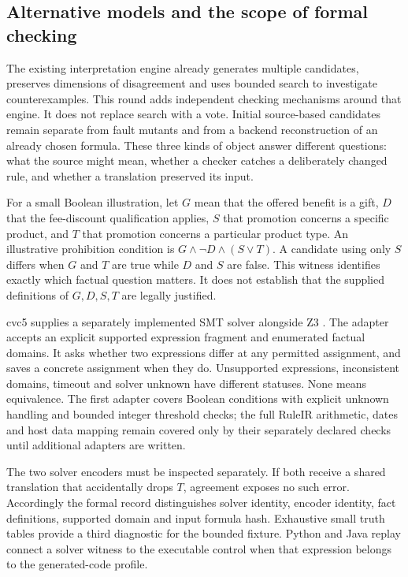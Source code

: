 \documentclass[12pt,a4paper,oneside,openany]{book}
\begin{document}
\subsection{Alternative models and the scope of formal checking}

The existing interpretation engine already generates multiple candidates,
preserves dimensions of disagreement and uses bounded search to investigate
counterexamples. This round adds independent checking mechanisms around that
engine. It does not replace search with a vote. Initial source-based candidates
remain separate from fault mutants and from a backend reconstruction of an
already chosen formula. These three kinds of object answer different questions:
what the source might mean, whether a checker catches a deliberately changed
rule, and whether a translation preserved its input.

For a small Boolean illustration, let $G$ mean that the offered benefit is a
gift, $D$ that the fee-discount qualification applies, $S$ that promotion concerns
a specific product, and $T$ that promotion concerns a particular product type.
An illustrative prohibition condition is $G\land\neg D\land(S\lor T)$. A
candidate using only $S$ differs when $G$ and $T$ are true while $D$ and $S$ are
false. This witness identifies exactly which factual question matters. It does
not establish that the supplied definitions of $G,D,S,T$ are legally justified.

cvc5 supplies a separately implemented SMT solver alongside Z3
\citep{cvc5software}. The adapter accepts an explicit supported expression
fragment and enumerated factual domains. It asks whether two expressions differ
at any permitted assignment, and saves a concrete assignment when they do.
Unsupported expressions, inconsistent domains, timeout and solver unknown have
different statuses. None means equivalence. The first adapter covers Boolean
conditions with explicit unknown handling and bounded integer threshold checks;
the full RuleIR arithmetic, dates and host data mapping remain covered only by
their separately declared checks until additional adapters are written.

The two solver encoders must be inspected separately. If both receive a shared
translation that accidentally drops $T$, agreement exposes no such error.
Accordingly the formal record distinguishes solver identity, encoder identity,
fact definitions, supported domain and input formula hash. Exhaustive small
truth tables provide a third diagnostic for the bounded fixture. Python and Java
replay connect a solver witness to the executable control when that expression
belongs to the generated-code profile.
\end{document}

